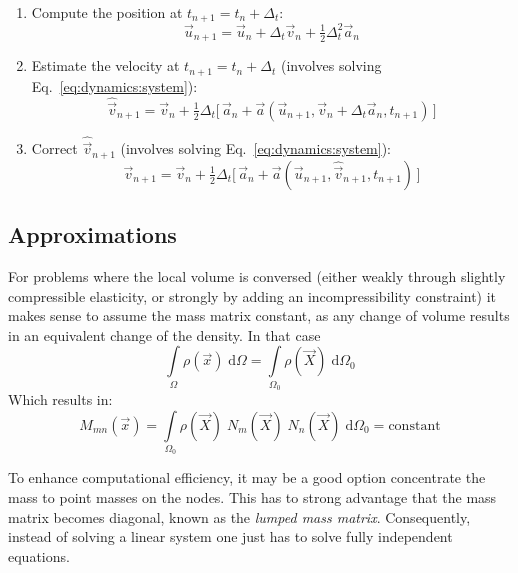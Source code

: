 \documentclass[times,namecite]{goose-article}
\begin{document}
\begin{enumerate}
  \item Compute the position at $t_{n+1} = t_{n} + \Delta_t$:
  \begin{equation}
    \vec{u}_{n+1}
    =
    \vec{u}_{n} + \Delta_t \vec{v}_{n} + \tfrac{1}{2} \Delta_t^2 \vec{a}_{n}
  \end{equation}
  \item Estimate the velocity at $t_{n+1} = t_{n} + \Delta_t$ (involves solving Eq.~\eqref{eq:dynamics:system}):
  \begin{equation}
    \hat{\vec{v}}_{n+1}
    =
    \vec{v}_{n}
    +
    \tfrac{1}{2} \Delta_t \Big[\,
      \vec{a}_{n} + \vec{a} ( \vec{u}_{n+1} , \vec{v}_{n} + \Delta_t \vec{a}_{n} , t_{n+1} ) \,
    \Big]
  \end{equation}
  \item Correct $\hat{\vec{v}}_{n+1}$ (involves solving Eq.~\eqref{eq:dynamics:system}):
  \begin{equation}
    \vec{v}_{n+1}
    =
    \vec{v}_{n}
    +
    \tfrac{1}{2} \Delta_t \Big[\,
      \vec{a}_{n} + \vec{a} ( \vec{u}_{n+1} , \hat{\vec{v}}_{n+1} , t_{n+1} ) \,
    \Big]
  \end{equation}
\end{enumerate}

\subsection{Approximations}

For problems where the local volume is conversed (either weakly through slightly compressible elasticity, or strongly by adding an incompressibility constraint) it makes sense to assume the mass matrix constant, as any change of volume results in an equivalent change of the density. In that case
\begin{equation}
  \int\limits_{\Omega}
    \rho(\vec{x})
  \;\mathrm{d}\Omega
  =
  \int\limits_{\Omega_0}
    \rho(\vec{X})
  \;\mathrm{d}\Omega_0
\end{equation}
Which results in:
\begin{equation}
  M_{mn}(\vec{x})
  =
  \int\limits_{\Omega_0}
    \rho(\vec{X})\; N_m(\vec{X})\; N_n(\vec{X}) \;
  \mathrm{d}\Omega_0
  =
  \mathrm{constant}
\end{equation}

To enhance computational efficiency, it may be a good option concentrate the mass to point masses on the nodes. This has to strong advantage that the mass matrix becomes diagonal, known as the \emph{lumped mass matrix}. Consequently, instead of solving a linear system one just has to solve fully independent equations.
\end{document}
